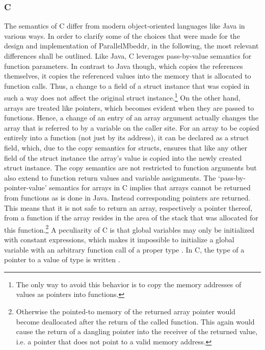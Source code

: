 \subsubsection{C}
\label{cBasics}
The semantics of C differ from modern object-oriented languages like Java in various ways. In order to clarify some of the choices that were made for the design and implementation of ParallelMbeddr, in the following, the most relevant differences shall be outlined. Like Java, C leverages pass-by-value semantics for function parameters. In contrast to Java though, which copies the references themselves, it copies the referenced values into the memory that is allocated to function calls. Thus, a change to a field of a struct instance that was copied in such a way does not affect the original struct instance.\footnote{The only way to avoid this behavior is to copy the memory addresses of values as pointers into functions.} On the other hand, arrays are treated like pointers, which becomes evident when they are passed to functions. Hence, a change of an entry of an array argument actually changes the array that is referred to by a variable on the caller site. For an array to be copied entirely into a function (not just by its address), it can be declared as a struct field, which, due to the copy semantics for structs, ensures that like any other field of the struct instance the array's value is copied into the newly created struct instance. The copy semantics are not restricted to function arguments but also extend to function return values and variable assignments. The `pass-by-pointer-value' semantics for arrays in C implies that arrays cannot be returned from functions as is done in Java. Instead corresponding pointers are returned. This means that it is not safe to return an array, respectively a pointer thereof, from a function if the array resides in the area of the stack that was allocated for this function.\footnote{Otherwise the pointed-to memory of the returned array pointer would become deallocated after the return of the called function. This again would cause the return of a dangling pointer into the receiver of the returned value, i.e. a pointer that does not point to a valid memory address.} 
A peculiarity of C is that global variables may only be initialized with constant expressions, which makes it impossible to initialize a global variable with an arbitrary function call of a proper type \cite[p.~48]{CForBASICProgrammers}. In C, the type of a pointer to a value of type  is written .

